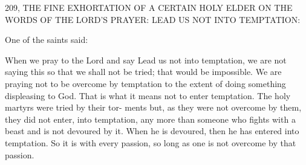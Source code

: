 209, THE FINE EXHORTATION OF A
CERTAIN HOLY ELDER ON THE WORDS OF THE
LORD'S PRAYER: LEAD US NOT INTO TEMPTATION:

One of the saints said:

When we pray to the Lord and say Lead us not into temptation, we
are not saying this so that we shall not be tried; that would be
impossible. We are praying not to be overcome by temptation to the
extent of doing something displeasing to God. That is what it means
not to enter temptation. The holy martyrs were tried by their tor-
ments but, as they were not overcome by them, they did not enter,
into temptation, any more than someone who fights with a beast
and is not devoured by it. When he is devoured, then he has entered
into temptation. So it is with every passion, so long as one is not
overcome by that passion.

